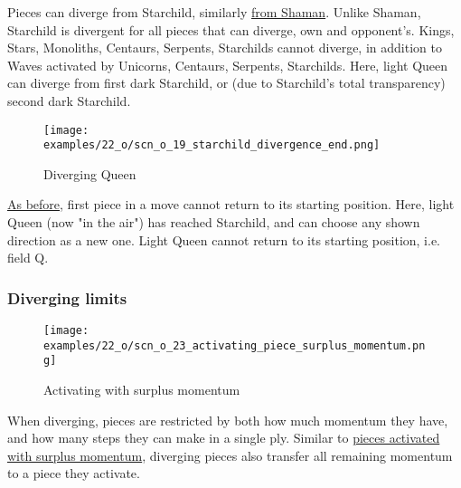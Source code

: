 \vspace*{-0.5\baselineskip}
Pieces can diverge from Starchild, similarly
\hyperref[fig:scn_cot_030_own_shaman_is_divergent_init]{from Shaman}. Unlike
Shaman, Starchild is divergent for all pieces that can diverge, own and opponent's.
Kings, Stars, Monoliths, Centaurs, Serpents, Starchilds cannot diverge, in addition
to Waves activated by Unicorns, Centaurs, Serpents, Starchilds. Here, light Queen
can diverge from first dark Starchild, or (due to Starchild's total transparency)
second dark Starchild.

\vspace*{-0.9\baselineskip}
\noindent
\begin{figure}[!h]
\texttt{[image: examples/22\_o/scn\_o\_19\_starchild\_divergence\_end.png]}
\vspace*{-1.4\baselineskip}
\caption{Diverging Queen}
\label{fig:scn_o_19_starchild_divergence_end}
\end{figure}

\vspace*{-0.5\baselineskip}
\hyperref[fig:scn_cot_059_diverging_first_piece]{As before}, first piece in a move
cannot return to its starting position. Here, light Queen (now "in the air") has
reached Starchild, and can choose any shown direction as a new one. Light Queen
cannot return to its starting position, i.e. field Q.

\clearpage %

\subsubsection*{Diverging limits}
\label{sec:One/Starchild/Divergence/Diverging limits}

\vspace*{-0.9\baselineskip}
\noindent
\begin{wrapfigure}[9]{l}{0.4\textwidth}
\centering
\texttt{[image: examples/22\_o/scn\_o\_23\_activating\_piece\_surplus\_momentum.png]}
\vspace*{-0.4\baselineskip}
\caption{Activating with surplus momentum}
\label{fig:scn_o_23_activating_piece_surplus_momentum}
\end{wrapfigure}
When diverging, pieces are restricted by both how much momentum they have, and how
many steps they can make in a single ply.\newline
\indent
Similar to
\hyperref[fig:scn_mv_35_single_step_piece_momentum]{pieces activated with surplus momentum},
diverging pieces also transfer all remaining momentum to a piece they activate.

